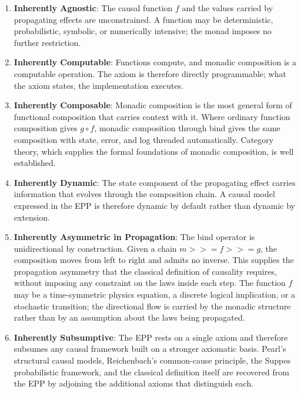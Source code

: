 \begin{enumerate}
	\item \textbf{Inherently Agnostic}: The causal function $f$ and the
	values carried by propagating effects are unconstrained. A function
	may be deterministic, probabilistic, symbolic, or numerically
	intensive; the monad imposes no further restriction.
	
	\item \textbf{Inherently Computable}: Functions compute, and monadic
	composition is a computable operation. The axiom is therefore
	directly programmable; what the axiom states, the implementation
	executes.
	
	\item \textbf{Inherently Composable}: Monadic composition is the most
	general form of functional composition that carries context with it.
	Where ordinary function composition gives $g \circ f$, monadic
	composition through bind gives the same composition with state,
	error, and log threaded automatically. Category theory, which
	supplies the formal foundations of monadic composition, is well
	established.
	
	\item \textbf{Inherently Dynamic}: The state component of the
	propagating effect carries information that evolves through the
	composition chain. A causal model expressed in the EPP is therefore
	dynamic by default rather than dynamic by extension.
	
	\item \textbf{Inherently Asymmetric in Propagation}: The bind operator
	is unidirectional by construction. Given a chain
	$m \mathbin{>\!\!>\!\!=} f \mathbin{>\!\!>\!\!=} g$, the composition
	moves from left to right and admits no inverse. This supplies the
	propagation asymmetry that the classical definition of causality
	requires, without imposing any constraint on the laws inside each
	step. The function $f$ may be a time-symmetric physics equation, a
	discrete logical implication, or a stochastic transition; the
	directional flow is carried by the monadic structure rather than by
	an assumption about the laws being propagated.
	
	\item \textbf{Inherently Subsumptive}: The EPP rests
on a single axiom and therefore subsumes any causal framework built on
a stronger axiomatic basis. Pearl's structural causal models, Reichenbach's
common-cause principle, the Suppes probabilistic framework, and the
classical definition itself are recovered from the EPP by adjoining the
additional axioms that distinguish each. 


\end{enumerate}
